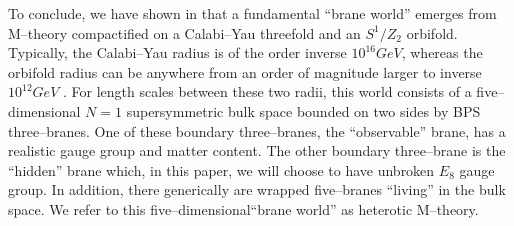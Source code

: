 \documentclass[a4paper,12pt]{article}
\numberwithin{equation}{section}
\theoremstyle{plain}
\begin{document}
To conclude, we have shown in \cite{losw1, losw2, nse} 
that a fundamental ``brane world'' emerges from
M--theory compactified on a Calabi--Yau threefold and an $S^{1}/Z_{2}$
orbifold. Typically, the Calabi--Yau
radius is of the order inverse $10^{16} GeV$, whereas the orbifold radius can
be anywhere from an order of magnitude larger to inverse 
$10^{12} GeV$ \cite{scales}. For
length scales between these two radii, 
this world consists of a five--dimensional $N=1$ supersymmetric bulk
space bounded on two sides by BPS three--branes. One of these boundary 
three--branes, the ``observable'' brane, has  a realistic gauge group 
and matter content. The other boundary three--brane is the ``hidden'' brane
which, in this paper, we will choose to have unbroken $E_{8}$ gauge group. 
In addition, there generically are wrapped five--branes ``living''
in the bulk space.  We refer to this five--dimensional``brane world'' 
as heterotic M--theory.
\end{document}
